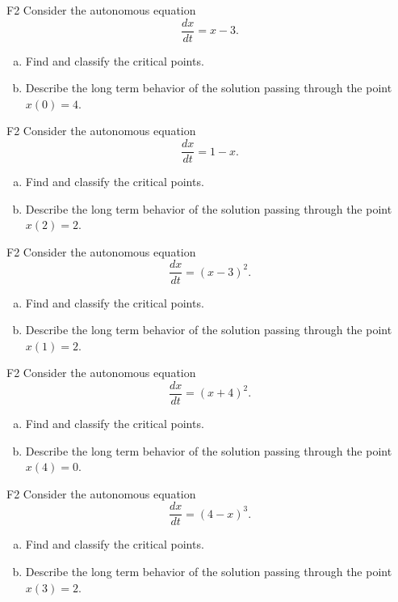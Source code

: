 \begin{problem}{F2}
Consider the autonomous equation
\[
\frac{dx}{dt} = x - 3.
\]
\begin{enumerate}[(a)]
\item Find and classify the critical points.
\item Describe the long term behavior of the solution passing through the point $x(0)=4$.
\end{enumerate}
\end{problem}

\begin{problem}{F2}
Consider the autonomous equation
\[
\frac{dx}{dt} = 1 - x.
\]
\begin{enumerate}[(a)]
\item Find and classify the critical points.
\item Describe the long term behavior of the solution passing through the point $x(2)=2$.
\end{enumerate}
\end{problem}

\begin{problem}{F2}
Consider the autonomous equation
\[
\frac{dx}{dt} = (x - 3)^2.
\]\begin{enumerate}[(a)]
\item Find and classify the critical points.
\item Describe the long term behavior of the solution passing through the point $x(1)=2$.
\end{enumerate}
\end{problem}

\begin{problem}{F2}
Consider the autonomous equation
\[
\frac{dx}{dt} = (x + 4)^2.
\]\begin{enumerate}[(a)]
\item Find and classify the critical points.
\item Describe the long term behavior of the solution passing through the point $x(4)=0$.
\end{enumerate}
\end{problem}

\begin{problem}{F2}
Consider the autonomous equation
\[
\frac{dx}{dt} = (4 - x)^3.
\]\begin{enumerate}[(a)]
\item Find and classify the critical points.
\item Describe the long term behavior of the solution passing through the point $x(3)=2$.
\end{enumerate}
\end{problem}

